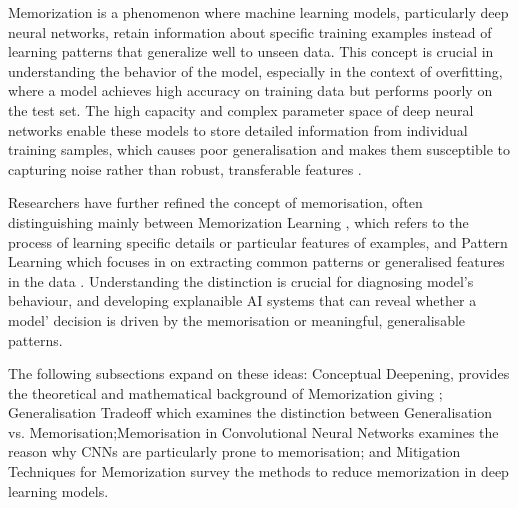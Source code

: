 Memorization is a phenomenon where machine learning models, particularly deep neural networks, retain information about specific training examples instead of learning patterns that generalize well to unseen data. This concept is crucial in understanding the behavior of the model, especially in the context of overfitting, where a model achieves high accuracy   on training data but performs poorly on the test set. The high capacity and complex parameter space of deep neural networks enable these models to store detailed information from individual training samples, which causes poor generalisation and makes them susceptible to capturing noise rather than robust, transferable features \cite{ali_raza_537a9747}. 

Researchers have further refined the concept of memorisation,  often distinguishing mainly between Memorization Learning , which refers to the process of learning specific details or particular features of examples, and Pattern Learning which focuses in on extracting common patterns or generalised features  in the data \cite{jiaheng_wei_8cfd95ec}. Understanding the distinction is crucial for diagnosing model’s behaviour, and developing explanaible AI systems that can reveal whether a  model’ decision is driven by the memorisation or meaningful, generalisable patterns. 

The following subsections expand on these ideas: Conceptual Deepening,  provides the theoretical and mathematical background of Memorization giving ; Generalisation Tradeoff which examines the distinction between Generalisation vs. Memorisation;Memorisation in Convolutional Neural Networks  examines the reason why CNNs are particularly prone to memorisation; and  Mitigation Techniques for Memorization survey the methods to reduce memorization in deep learning models.
